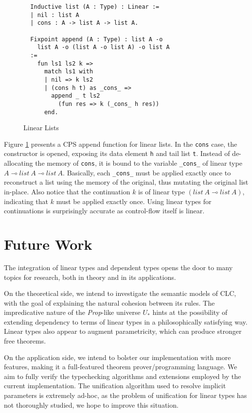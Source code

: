 \documentclass[sigplan,screen,review,authordraft]{acmart}
\theoremstyle{definition}
\begin{document}
  \begin{figure}[h]
  \vspace{-0.6em}
  \caption{Linear Lists}
  \begin{lstlisting}
  Inductive list (A : Type) : Linear :=
  | nil : list A
  | cons : A -> list A -> list A.
  
  Fixpoint append (A : Type) : list A -o 
    list A -o (list A -o list A) -o list A 
  :=
    fun ls1 ls2 k =>
      match ls1 with
      | nil => k ls2
      | (cons h t) as _cons_ => 
        append _ t ls2 
          (fun res => k (_cons_ h res))
      end.
  \end{lstlisting}
  \label{list}
  \vspace{-0.6em}
  \Description{}
  \end{figure}

  Figure \ref{list} presents a CPS append function for linear lists. In the \texttt{cons} case, the constructor is opened, exposing its data element \texttt{h} and tail list \texttt{t}. Instead of de-allocating the memory of \texttt{cons}, it is bound to the variable \texttt{_cons_} of linear type $A \multimap list\ A \multimap list\ A$. Basically, each \texttt{_cons_} must be applied exactly once to reconstruct a list using the memory of the original, thus mutating the original list in-place. Also notice that the continuation $k$ is of linear type $(list\ A \multimap list\ A)$, indicating that $k$ must be applied exactly once. Using linear types for continuations is surprisingly accurate as control-flow itself is linear.

  \section{Future Work}
  The integration of linear types and dependent types opens the door to many topics for research, both in theory and in its applications.

  On the theoretical side, we intend to investigate the semantic models of CLC, with the goal of explaining the natural cohesion between its rules. The impredicative nature of the \textit{Prop}-like universe $U_*$ hints at the possibility of extending dependency to terms of linear types in a philosophically satisfying way. Linear types also appear to augment parametricity, which can produce stronger free theorems.

  On the application side, we intend to bolster our implementation with more features, making it a full-featured theorem prover/programming language. We aim to fully verify the typechecking algorithms and extensions employed by the current implementation. The unification algorithm used to resolve implicit parameters is extremely ad-hoc, as the problem of unification for linear types has not thoroughly studied, we hope to improve this situation.
\end{document}
